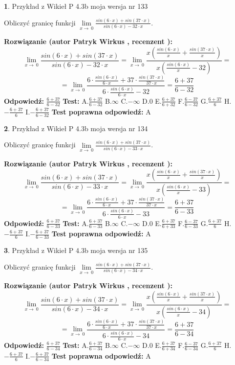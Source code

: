 \documentclass[12pt, a4paper]{article}
\theoremstyle{definition} %
\newtheorem{zad}{}
\newcommand{\zadStart}[1]{\begin{zad}#1\newline}
\newcommand{\zadStop}{\end{zad}}
\newcommand{\rozwStart}[2]{\noindent \textbf{Rozwiązanie (autor #1 , recenzent #2): }\newline}
\newcommand{\rozwStop}{\newline}
\newcommand{\odpStart}{\noindent \textbf{Odpowiedź:}\newline}
\newcommand{\odpStop}{\newline}
\newcommand{\testStart}{\noindent \textbf{Test:}\newline}
\newcommand{\testStop}{\newline}
\newcommand{\kluczStart}{\noindent \textbf{Test poprawna odpowiedź:}\newline}
\newcommand{\kluczStop}{\newline}
\begin{document}
\zadStart{Przykład z Wikieł P 4.3b moja wersja nr 133}


Obliczyć granicę funkcji $\lim\limits_{x\to\ 0}\frac{sin(6 \cdot x)+sin(37 \cdot x)}{sin(6 \cdot x)-32 \cdot x}$.
\zadStop
\rozwStart{Patryk Wirkus}{}
$$\lim\limits_{x\to\ 0}\frac{sin(6 \cdot x)+sin(37 \cdot x)}{sin(6 \cdot x)-32 \cdot x}=\lim\limits_{x\to\ 0}\frac{x(\frac{sin(6 \cdot x)}{x}+\frac{sin(37 \cdot x)}{x})}{x(\frac{sin(6 \cdot x)}{x}-32)}=$$
$$=\lim\limits_{x\to\ 0}\frac{6 \cdot \frac{sin(6 \cdot x)}{6 \cdot x}+37 \cdot \frac{sin(37 \cdot x)}{37 \cdot x}}{6 \cdot \frac{sin(6 \cdot x)}{6 \cdot x}-32}=\frac{6+37}{6-32}$$
\rozwStop
\odpStart
$\frac{6+37}{6-32}$
\odpStop
\testStart
A.$\frac{6+37}{6-32}$
B.$\infty$
C.$-\infty$
D.$0$
E.$\frac{6+37}{6+32}$
F.$\frac{6-37}{6-32}$
G.$\frac{6+37}{6}$
H.$-\frac{6+37}{6}$
I.$-\frac{6+37}{6-32}$
\testStop
\kluczStart
A
\kluczStop



\zadStart{Przykład z Wikieł P 4.3b moja wersja nr 134}


Obliczyć granicę funkcji $\lim\limits_{x\to\ 0}\frac{sin(6 \cdot x)+sin(37 \cdot x)}{sin(6 \cdot x)-33 \cdot x}$.
\zadStop
\rozwStart{Patryk Wirkus}{}
$$\lim\limits_{x\to\ 0}\frac{sin(6 \cdot x)+sin(37 \cdot x)}{sin(6 \cdot x)-33 \cdot x}=\lim\limits_{x\to\ 0}\frac{x(\frac{sin(6 \cdot x)}{x}+\frac{sin(37 \cdot x)}{x})}{x(\frac{sin(6 \cdot x)}{x}-33)}=$$
$$=\lim\limits_{x\to\ 0}\frac{6 \cdot \frac{sin(6 \cdot x)}{6 \cdot x}+37 \cdot \frac{sin(37 \cdot x)}{37 \cdot x}}{6 \cdot \frac{sin(6 \cdot x)}{6 \cdot x}-33}=\frac{6+37}{6-33}$$
\rozwStop
\odpStart
$\frac{6+37}{6-33}$
\odpStop
\testStart
A.$\frac{6+37}{6-33}$
B.$\infty$
C.$-\infty$
D.$0$
E.$\frac{6+37}{6+33}$
F.$\frac{6-37}{6-33}$
G.$\frac{6+37}{6}$
H.$-\frac{6+37}{6}$
I.$-\frac{6+37}{6-33}$
\testStop
\kluczStart
A
\kluczStop



\zadStart{Przykład z Wikieł P 4.3b moja wersja nr 135}


Obliczyć granicę funkcji $\lim\limits_{x\to\ 0}\frac{sin(6 \cdot x)+sin(37 \cdot x)}{sin(6 \cdot x)-34 \cdot x}$.
\zadStop
\rozwStart{Patryk Wirkus}{}
$$\lim\limits_{x\to\ 0}\frac{sin(6 \cdot x)+sin(37 \cdot x)}{sin(6 \cdot x)-34 \cdot x}=\lim\limits_{x\to\ 0}\frac{x(\frac{sin(6 \cdot x)}{x}+\frac{sin(37 \cdot x)}{x})}{x(\frac{sin(6 \cdot x)}{x}-34)}=$$
$$=\lim\limits_{x\to\ 0}\frac{6 \cdot \frac{sin(6 \cdot x)}{6 \cdot x}+37 \cdot \frac{sin(37 \cdot x)}{37 \cdot x}}{6 \cdot \frac{sin(6 \cdot x)}{6 \cdot x}-34}=\frac{6+37}{6-34}$$
\rozwStop
\odpStart
$\frac{6+37}{6-34}$
\odpStop
\testStart
A.$\frac{6+37}{6-34}$
B.$\infty$
C.$-\infty$
D.$0$
E.$\frac{6+37}{6+34}$
F.$\frac{6-37}{6-34}$
G.$\frac{6+37}{6}$
H.$-\frac{6+37}{6}$
I.$-\frac{6+37}{6-34}$
\testStop
\kluczStart
A
\kluczStop
\end{document}
